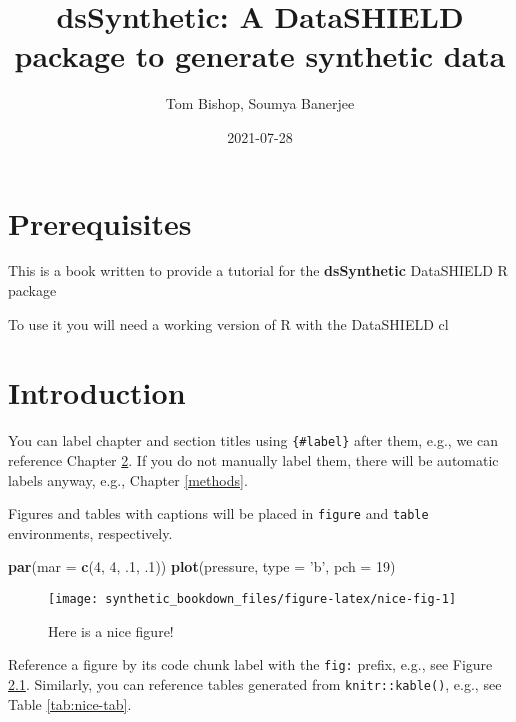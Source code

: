 \documentclass[
]{book}
\title{dsSynthetic: A DataSHIELD package to generate synthetic data}
\author{Tom Bishop, Soumya Banerjee}
\date{2021-07-28}
\newenvironment{Shaded}{\begin{snugshade}}{\end{snugshade}}
\newcommand{\DataTypeTok}[1]{\textcolor[rgb]{0.13,0.29,0.53}{#1}}
\newcommand{\DecValTok}[1]{\textcolor[rgb]{0.00,0.00,0.81}{#1}}
\newcommand{\FloatTok}[1]{\textcolor[rgb]{0.00,0.00,0.81}{#1}}
\newcommand{\KeywordTok}[1]{\textcolor[rgb]{0.13,0.29,0.53}{\textbf{#1}}}
\newcommand{\NormalTok}[1]{#1}
\newcommand{\StringTok}[1]{\textcolor[rgb]{0.31,0.60,0.02}{#1}}
\begin{document}
\maketitle

{
\setcounter{tocdepth}{1}
\tableofcontents
}
\hypertarget{prerequisites}{%
\chapter{Prerequisites}\label{prerequisites}}

This is a book written to provide a tutorial for the \textbf{dsSynthetic} DataSHIELD R package

To use it you will need a working version of R with the DataSHIELD cl

\hypertarget{intro}{%
\chapter{Introduction}\label{intro}}

You can label chapter and section titles using \texttt{\{\#label\}} after them, e.g., we can reference Chapter \ref{intro}. If you do not manually label them, there will be automatic labels anyway, e.g., Chapter \ref{methods}.

Figures and tables with captions will be placed in \texttt{figure} and \texttt{table} environments, respectively.

\begin{Shaded}
\begin{Highlighting}[]
\KeywordTok{par}\NormalTok{(}\DataTypeTok{mar =} \KeywordTok{c}\NormalTok{(}\DecValTok{4}\NormalTok{, }\DecValTok{4}\NormalTok{, }\FloatTok{.1}\NormalTok{, }\FloatTok{.1}\NormalTok{))}
\KeywordTok{plot}\NormalTok{(pressure, }\DataTypeTok{type =} \StringTok{'b'}\NormalTok{, }\DataTypeTok{pch =} \DecValTok{19}\NormalTok{)}
\end{Highlighting}
\end{Shaded}

\begin{figure}

{\centering \texttt{[image: synthetic\_bookdown\_files/figure-latex/nice-fig-1]} 

}

\caption{Here is a nice figure!}\label{fig:nice-fig}
\end{figure}

Reference a figure by its code chunk label with the \texttt{fig:} prefix, e.g., see Figure \ref{fig:nice-fig}. Similarly, you can reference tables generated from \texttt{knitr::kable()}, e.g., see Table \ref{tab:nice-tab}.
\end{document}

